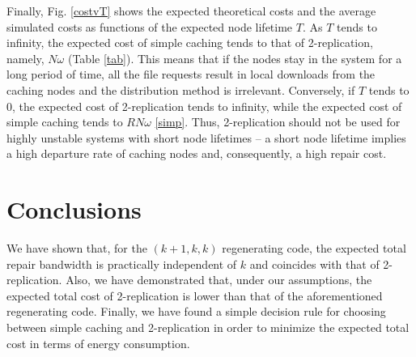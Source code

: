 \documentclass[10pt,conference]{IEEEtran}
\begin{document}
Finally, Fig. \ref{costvT} shows the expected theoretical costs and the average simulated costs as functions of the expected node lifetime $T$. As $T$ tends to infinity, the expected cost of simple caching tends to that of 2-replication, namely, $N\omega$ (Table \ref{tab}). This means that if the nodes stay in the system for a long period of time, all the file requests result in local downloads from the caching nodes and the distribution method is irrelevant. Conversely, if $T$ tends to $0$, the expected cost of 2-replication tends to infinity, while the expected cost of simple caching tends to $RN\omega$ \eqref{simp}. Thus, 2-replication should not be used for highly unstable systems with short node lifetimes -- a short node lifetime implies a high departure rate of caching nodes and, consequently, a high repair cost.

\section{Conclusions}\label{conclusionssec}
We have shown that, for the $(k{+}1,k,k)$ regenerating code, the expected total repair bandwidth is practically independent of $k$ and coincides with that of 2-replication. Also, we have demonstrated that, under our assumptions, the expected total cost of 2-replication is lower than that of the aforementioned regenerating code. Finally, we have found a simple decision rule for choosing between simple caching and 2-replication in order to minimize the expected total cost in terms of energy consumption.
\end{document}
